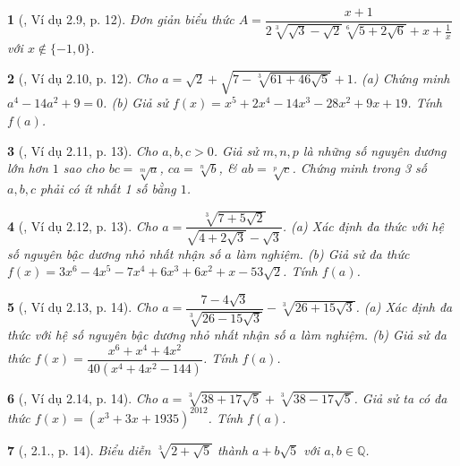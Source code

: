 \documentclass{article}
\newtheorem{baitoan}{}%
\begin{document}
\begin{baitoan}[\cite{TLCT_THCS_Toan_9_dai_so}, Ví dụ 2.9, p. 12]
	Đơn giản biểu thức $A = \dfrac{x + 1}{2\sqrt[3]{\sqrt{3} - \sqrt{2}}\sqrt[6]{5 + 2\sqrt{6}} + x + \frac{1}{x}}$ với $x\notin\{-1,0\}$.
\end{baitoan}

\begin{baitoan}[\cite{TLCT_THCS_Toan_9_dai_so}, Ví dụ 2.10, p. 12]
	Cho $a = \sqrt{2} + \sqrt{7 - \sqrt[3]{61 + 46\sqrt{5}}} + 1$. (a) Chứng minh $a^4 - 14a^2 + 9 = 0$. (b) Giả sử $f(x) = x^5 + 2x^4 - 14x^3 - 28x^2 + 9x + 19$. Tính $f(a)$.
\end{baitoan}

\begin{baitoan}[\cite{TLCT_THCS_Toan_9_dai_so}, Ví dụ 2.11, p. 13]
	Cho $a,b,c > 0$. Giả sử $m,n,p$ là những số nguyên dương lớn hơn $1$ sao cho $bc = \sqrt[m]{a}$, $ca = \sqrt[n]{b}$, \& $ab = \sqrt[p]{c}$. Chứng minh trong 3 số $a,b,c$ phải có ít nhất 1 số bằng $1$.
\end{baitoan}

\begin{baitoan}[\cite{TLCT_THCS_Toan_9_dai_so}, Ví dụ 2.12, p. 13]
	Cho $a = \dfrac{\sqrt[3]{7 + 5\sqrt{2}}}{\sqrt{4 + 2\sqrt{3}} - \sqrt{3}}$. (a) Xác định đa thức với hệ số nguyên bậc dương nhỏ nhất nhận số $a$ làm nghiệm. (b) Giả sử đa thức $f(x) = 3x^6 - 4x^5 - 7x^4 + 6x^3 + 6x^2 + x - 53\sqrt{2}$. Tính $f(a)$.
\end{baitoan}

\begin{baitoan}[\cite{TLCT_THCS_Toan_9_dai_so}, Ví dụ 2.13, p. 14]
	Cho $a = \dfrac{7- 4\sqrt{3}}{\sqrt[3]{26 - 15\sqrt{3}}} - \sqrt[3]{26 + 15\sqrt{3}}$. (a) Xác định đa thức với hệ số nguyên bậc dương nhỏ nhất nhận số $a$ làm nghiệm. (b) Giả sử đa thức $f(x) = \dfrac{x^6 + x^4 + 4x^2}{40(x^4 + 4x^2 - 144)}$. Tính $f(a)$.
\end{baitoan}

\begin{baitoan}[\cite{TLCT_THCS_Toan_9_dai_so}, Ví dụ 2.14, p. 14]
	Cho $a = \sqrt[3]{38 + 17\sqrt{5}} + \sqrt[3]{38 - 17\sqrt{5}}$. Giả sử ta có đa thức $f(x) = (x^3 + 3x + 1935)^{2012}$. Tính $f(a)$.
\end{baitoan}

\begin{baitoan}[\cite{TLCT_THCS_Toan_9_dai_so}, 2.1., p. 14]
	Biểu diễn $\sqrt[3]{2 + \sqrt{5}}$ thành $a + b\sqrt{5}$ với $a,b\in\mathbb{Q}$.
\end{baitoan}
\end{document}

